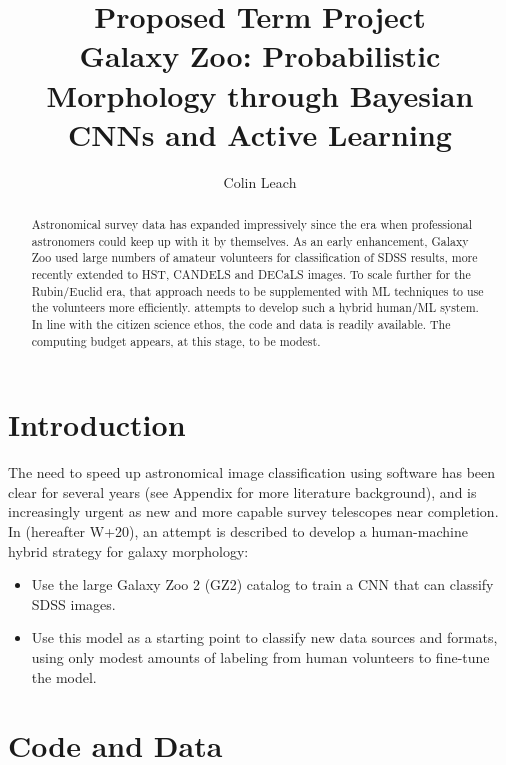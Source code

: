\documentclass[twocolumn, twocolappendix, tighten]{aastex631}
\begin{document}
\title{Proposed Term Project \\Galaxy Zoo: Probabilistic Morphology through Bayesian CNNs and Active Learning}


%
\author[0000-0003-3608-1546]{Colin Leach}

\begin{abstract}

Astronomical survey data has expanded impressively since the era when professional astronomers could keep up with it by themselves. As an early enhancement, Galaxy Zoo used large numbers of amateur volunteers for classification of SDSS results, more recently extended to HST, CANDELS and DECaLS images. To scale further for the Rubin/Euclid era, that approach needs to be supplemented with ML techniques to use the volunteers more efficiently. \citet{walmsley_galaxy_2020} attempts to develop such a hybrid human/ML system. In line with the citizen science ethos, the code and data is readily available. The computing budget appears, at this stage, to be modest.\\

\end{abstract} 

\section{Introduction} \label{sec:intro}

The need to speed up astronomical image classification using software has been clear for several years  (see Appendix for more literature background), and is increasingly urgent as new and more capable survey telescopes near completion. In \citet{walmsley_galaxy_2020} (hereafter W+20), an attempt is described to develop a human-machine hybrid strategy for galaxy morphology:
\begin{itemize}
	\item Use the large Galaxy Zoo 2 (GZ2) catalog to train a CNN that can classify SDSS images.
	\item Use this model as a starting point to classify new data sources and formats, using only modest amounts of labeling from human volunteers to fine-tune the model.
\end{itemize}


\section{Code and Data} \label{sec:avail}
\end{document}
